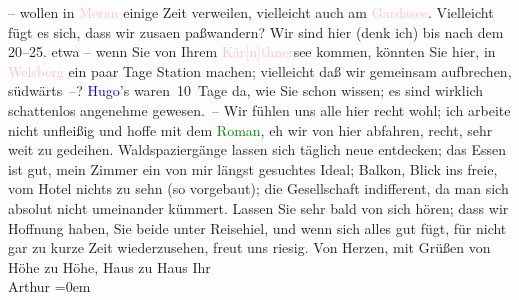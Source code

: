                – wollen in \textcolor{pink}{Meran}{}\ledrightnote{\textcolor{pink}{Meran}} einige Zeit verweilen,
               vielleicht auch am \textcolor{pink}{Gardasee}{}\ledrightnote{\textcolor{pink}{Lago di Garda}}. Vielleicht fügt es
               sich, dass wir zusa{\geminationm}en paßwandern? Wir sind hier (denk
               ich) bis nach dem 20–25. etwa – wenn Sie von Ihrem \textcolor{pink}{Kär{[}n{]}thner}{}\ledrightnote{\textcolor{pink}{Kärnten}}see kommen, könnten Sie
               hier, in \textcolor{pink}{Welsberg}{}\ledrightnote{\textcolor{pink}{Welsberg-Taisten}} ein paar Tage {\pb}Station machen; vielleicht daß wir gemeinsam
               aufbrechen, südwärts –?\pend
           \pstart
           \textcolor{blue}{Hugo}{}\ledrightnote{\textcolor{blue}{Hugo von Hofmannsthal}{\newline}\textcolor{blue}{Gertrude von Hofmannsthal}}’s waren 10 Tage da, wie Sie schon
               wissen; es sind wirklich schattenlos angenehme gewesen. – Wir fühlen uns alle hier
               recht wohl; ich arbeite nicht unfleißig und hoffe mit dem \textcolor{green}{Roman}{}, eh wir von hier abfahren, recht, sehr
               weit zu gedeihen. Waldspaziergänge lassen sich täglich neue entdecken; das Essen ist
               gut, mein Zimmer ein von mir längst gesuchtes Ideal; Balkon, Blick ins freie, vom
               Hotel nichts zu sehn (so vorgebaut); die Gesellschaft indifferent, da man sich
               absolut nicht umeinander kümmert.\pend
           \pstart
           Lassen Sie sehr bald von sich hören; dass wir Hoffnung haben, Sie beide unter
                  Reisehi{\geminationm}el, und wenn sich alles gut fügt, für nicht
               gar zu kurze Zeit wiederzusehen, freut uns riesig.\pend
           \pstart
           Von Herzen, mit Grüßen von Höhe zu Höhe, Haus zu Haus\pend
           \pstart
           Ihr{\\[\baselineskip]}\spacefill\mbox{Arthur}\pend
           \leftskip=0em{}\endnumbering{}  
      